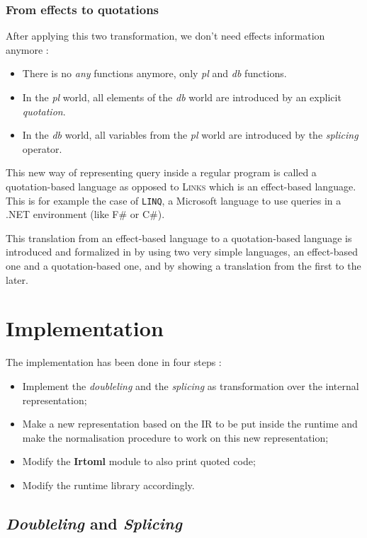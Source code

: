 \documentclass[11pt]{article}
\newcommand\mysc[1]{{\rmfamily\textsc{#1}}\xspace}
\newcommand\links{\mysc{Links}}
\newcommand\effect[1]{{\em #1}}
\newcommand\module[1]{{\bf #1}}
\begin{document}
\subsubsection{From effects to quotations}

After applying this two transformation, we don't need effects information anymore :
\begin{itemize}
\item There is no \effect{any} functions anymore, only \effect{pl} and \effect{db} functions.
\item In the \effect{pl} world, all elements of the \effect{db} world are introduced by an explicit \emph{quotation}.
\item In the \effect{db} world, all variables from the \effect{pl} world are introduced by the \emph{splicing} operator.
\end{itemize}

This new way of representing query inside a regular program is called a quotation-based language as opposed to \links which is an effect-based language. 
This is for example the case of {\tt LINQ}, a Microsoft language to use queries in a .NET environment (like F\# or C\#). 

This translation from an effect-based language to a quotation-based language is introduced and formalized in \cite{links:querycomp} by using two very simple languages, an effect-based one and a quotation-based one, and by showing a translation from the first to the later.

\section{Implementation}

The implementation has been done in four steps :
\begin{itemize}
\item Implement the \emph{doubleling} and the \emph{splicing} as transformation over the internal representation;
\item Make a new representation based on the IR to be put inside the runtime and make the normalisation procedure to work on this new representation;
\item Modify the \module{Irtoml} module to also print quoted code;
\item Modify the runtime library accordingly. 
\end{itemize}

\subsection{\emph{Doubleling} and \emph{Splicing}}
\end{document}
